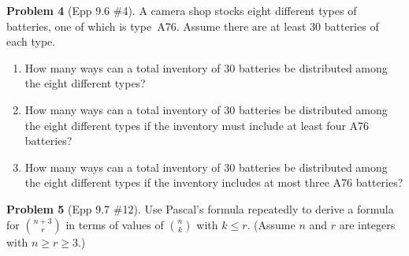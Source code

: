 \documentclass[11pt]{article}
\begin{document}
\bigskip

\noindent\textbf{Problem 4} (Epp 9.6 \#4). \;
A camera shop stocks eight different types of batteries, one of which is
type~A76.  Assume there are at least 30 batteries of each type.
\begin{enumerate}[label=\alph*.]
  \item How many ways can a total inventory of 30 batteries be distributed
        among the eight different types?
  \item How many ways can a total inventory of 30 batteries be distributed
        among the eight different types if the inventory must include at
        least four A76 batteries?
  \item How many ways can a total inventory of 30 batteries be distributed
        among the eight different types if the inventory includes at most
        three A76 batteries?
\end{enumerate}

\bigskip

\noindent\textbf{Problem 5} (Epp 9.7 \#12). \;
Use Pascal's formula repeatedly to derive a formula for
$\displaystyle\binom{n+3}{r}$ in terms of values of $\displaystyle\binom{n}{k}$
with $k \le r$.
(Assume $n$ and $r$ are integers with $n \ge r \ge 3$.)
\end{document}
